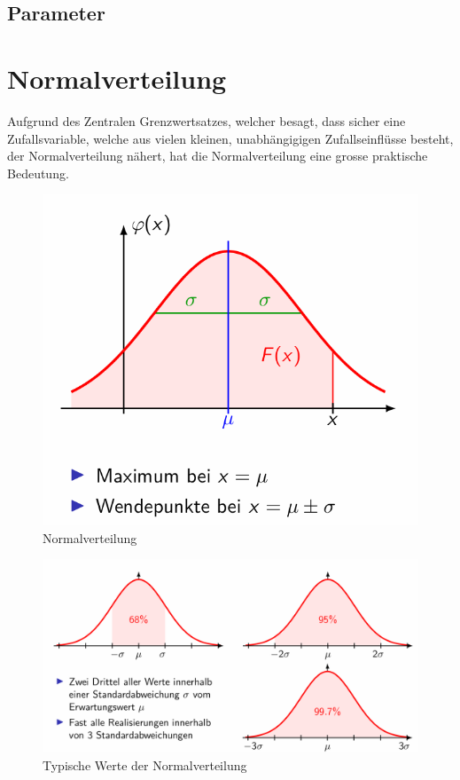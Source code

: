 \documentclass[../Main.tex]{subfiles}
\begin{document}
\subsection{Parameter}

\section{Normalverteilung}
Aufgrund des Zentralen Grenzwertsatzes, welcher besagt,
dass sicher eine Zufallsvariable, welche aus vielen kleinen,
unabhängigigen Zufallseinflüsse besteht, der Normalverteilung
nähert, hat die Normalverteilung eine grosse praktische Bedeutung.


\begin{figure}[H]
    \centering
    \includegraphics[width=0.5\linewidth]{Images/normalverteilung.png}
    \caption{Normalverteilung}
\end{figure}


\begin{figure}[H]
    \centering
    \includegraphics[width=1\linewidth]{Images/norm-typische-werte.png}
    \caption{Typische Werte der Normalverteilung}
\end{figure}
\end{document}
